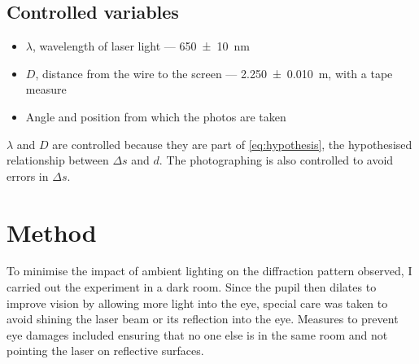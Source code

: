 \documentclass[a4paper, 12pt]{article}
\begin{document}
\subsection*{Controlled variables}
\begin{itemize}
\itemsep 0em
    \item $\lambda$, wavelength of laser light --- \SI{650+-10}{\nm} \autocite{laser-specs}
    \item $D$, distance from the wire to the screen --- \SI{2.250+-0.010}{\m}, with a tape measure
    \item Angle and position from which the photos are taken
\end{itemize}
$\lambda$ and $D$ are controlled because they are part of \cref{eq:hypothesis}, the hypothesised relationship between $\Delta s$ and $d$. 
The photographing is also controlled to avoid errors in $\Delta s$.

\section{Method}
To minimise the impact of ambient lighting on the diffraction pattern observed, I carried out the experiment in a dark room. 
Since the pupil then dilates to improve vision by allowing more light into the eye, special care was taken to avoid shining the laser beam or its reflection into the eye. 
Measures to prevent eye damages included ensuring that no one else is in the same room and not pointing the laser on reflective surfaces.
\end{document}
